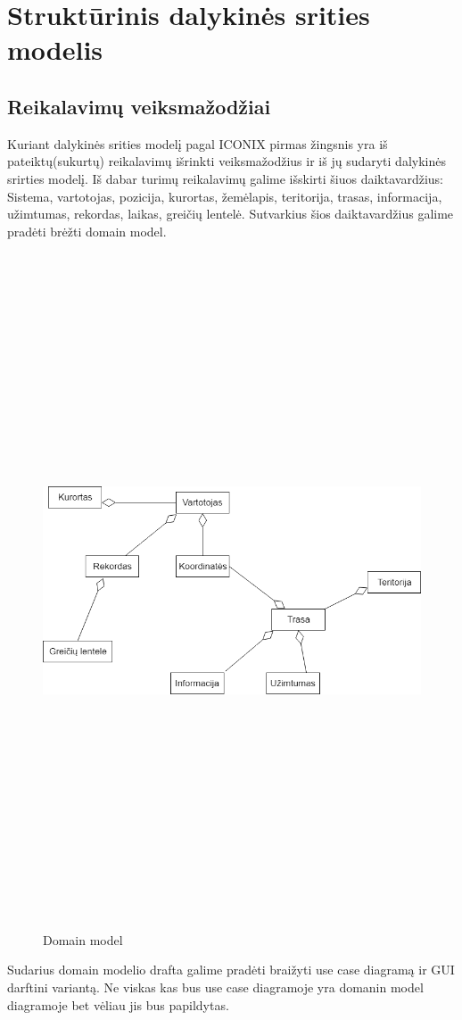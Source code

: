 \documentclass[oneside]{VUMIFPSkursinis}
\begin{document}
\section{Struktūrinis dalykinės srities modelis}
\subsection{Reikalavimų veiksmažodžiai}
	Kuriant dalykinės srities modelį pagal ICONIX pirmas žingsnis yra iš pateiktų(sukurtų) reikalavimų išrinkti veiksmažodžius ir iš jų sudaryti dalykinės srirties modelį. Iš  dabar turimų reikalavimų galime išskirti šiuos daiktavardžius:
	\newline
	\newline
	Sistema, vartotojas,  pozicija, kurortas, žemėlapis, teritorija, trasas, informacija, užimtumas, rekordas, laikas, greičių lentelė. 
	\newline
	\newline
	Sutvarkius šios daiktavardžius galime pradėti brėžti domain model. 
\begin{figure}[H]
		\centering	
	\includegraphics[width=18cm,height=20cm,keepaspectratio]{DomainModel.png}
	\caption{Domain model}
	\label{fig:Domain model}
\end{figure}
Sudarius domain modelio drafta galime pradėti braižyti use case diagramą ir GUI darftini variantą. Ne viskas kas bus use case diagramoje yra domanin model diagramoje bet vėliau jis bus papildytas.
\end{document}
